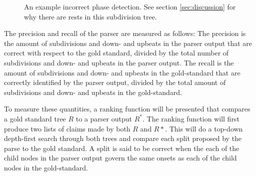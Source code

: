 \begin{figure}
\centering
{}
\caption{An example incorrect phase detection. See section \ref{sec:discussion} for why there are rests in this subdivision tree.}
\label{fig:phase_error}
\end{figure}


The precision and recall of the parser are measured as follows: The precision is the amount of subdivisions and down- and upbeats in the parser output that are correct with respect to the gold standard, divided by the total number of subdivisions and down- and upbeats in the parser output. The recall is the amount of subdivisions and down- and upbeats in the gold-standard that are correctly identified by the parser output, divided by the total amount of subdivisions and down- and upbeats in the gold-standard.

To measure these quantities, a ranking function will be presented that compares a gold standard tree $R$ to a parser output $R^*$. The ranking function will first produce two lists of claims made by  both $R$ and $R*$. 
 This  will do a top-down depth-first search through both trees and compare each split proposed by the parse to the gold standard. A split is said to be correct when the each of the child nodes in the parser output govern the same onsets as each of the child nodes in the gold-standard.


